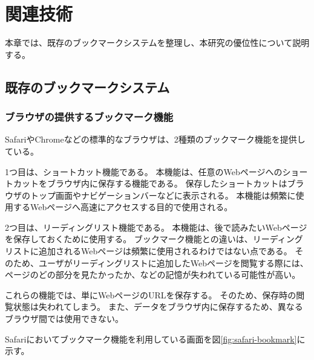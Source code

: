 \chapter{関連技術}
\label{chap:related_works}

本章では、既存のブックマークシステムを整理し、本研究の優位性について説明する。

\section{既存のブックマークシステム}

\subsection{ブラウザの提供するブックマーク機能}
SafariやChromeなどの標準的なブラウザは、2種類のブックマーク機能を提供している。

1つ目は、ショートカット機能である。
本機能は、任意のWebページへのショートカットをブラウザ内に保存する機能である。
保存したショートカットはブラウザのトップ画面やナビゲーションバーなどに表示される。
本機能は頻繁に使用するWebページへ高速にアクセスする目的で使用される。

2つ目は、リーディングリスト機能である。
本機能は、後で読みたいWebページを保存しておくために使用する。
ブックマーク機能との違いは、リーディングリストに追加されるWebページは頻繁に使用されるわけではない点である。
そのため、ユーザがリーディングリストに追加したWebページを閲覧する際には、ページのどの部分を見たかったか、などの記憶が失われている可能性が高い。

これらの機能では、単にWebページのURLを保存する。
そのため、保存時の閲覧状態は失われてしまう。
また、データをブラウザ内に保存するため、異なるブラウザ間では使用できない。

Safariにおいてブックマーク機能を利用している画面を図\ref{fig:safari-bookmark}に示す。

